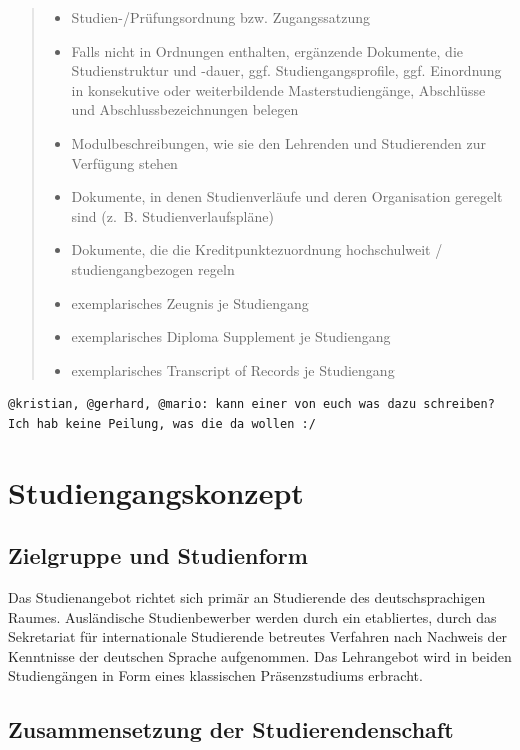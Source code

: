 \begin{quote}
\begin{itemize}
\item
  Studien-/Prüfungsordnung bzw. Zugangssatzung
\item
  Falls nicht in Ordnungen enthalten, ergänzende Dokumente, die
  Studienstruktur und -dauer, ggf. Studiengangsprofile, ggf. Einordnung
  in konsekutive oder weiterbildende Masterstudiengänge, Abschlüsse und
  Abschlussbezeichnungen belegen
\item
  Modulbeschreibungen, wie sie den Lehrenden und Studierenden zur
  Verfügung stehen
\item
  Dokumente, in denen Studienverläufe und deren Organisation geregelt
  sind (z.~B. Studienverlaufspläne)
\item
  Dokumente, die die Kreditpunktezuordnung hochschulweit /
  studiengangbezogen regeln
\item
  exemplarisches Zeugnis je Studiengang
\item
  exemplarisches Diploma Supplement je Studiengang
\item
  exemplarisches Transcript of Records je Studiengang
\end{itemize}
\end{quote}

\begin{verbatim}
@kristian, @gerhard, @mario: kann einer von euch was dazu schreiben? Ich hab keine Peilung, was die da wollen :/
\end{verbatim}

\chapter{Studiengangskonzept}\label{studiengangskonzept}

\section{Zielgruppe und
Studienform}\label{zielgruppe-und-studienform}

Das Studienangebot richtet sich primär an Studierende des
deutschsprachigen Raumes. Ausländische Studienbewerber werden durch ein
etabliertes, durch das Sekretariat für internationale Studierende
betreutes Verfahren nach Nachweis der Kenntnisse der deutschen Sprache
aufgenommen. Das Lehrangebot wird in beiden Studiengängen in Form eines
klassischen Präsenzstudiums erbracht.

\section{Zusammensetzung der
Studierendenschaft}\label{zusammensetzung-der-studierendenschaft}

